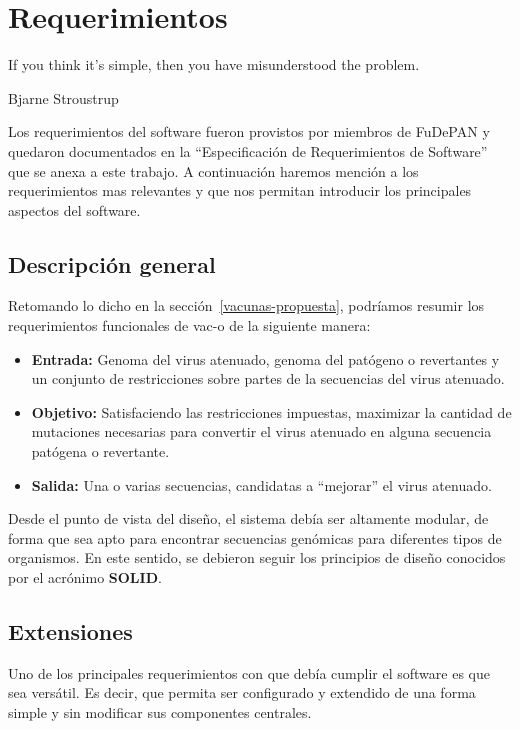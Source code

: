 \chapter{Requerimientos}
\epigraph{If you think it's simple, then you have misunderstood the problem.}%
{Bjarne Stroustrup}

Los requerimientos del software fueron provistos por miembros de \ac{FuDePAN} y
quedaron documentados en la ``Especificaci\'on de Requerimientos de Software''
que se anexa a este trabajo. A continuaci\'on haremos menci\'on a los
requerimientos mas relevantes y que nos permitan introducir los principales
aspectos del software.

\section{Descripci\'on general}

Retomando lo dicho en la secci\'on~\ref{vacunas-propuesta}, podr\'iamos
resumir los requerimientos funcionales de \ac{vac-o} de la siguiente manera:

\begin{itemize}
 \item \textbf{Entrada:} Genoma del virus atenuado, genoma del pat\'ogeno o
revertantes y un conjunto de restricciones sobre partes de la secuencias del
virus atenuado.
 \item \textbf{Objetivo:} Satisfaciendo las restricciones impuestas, maximizar
la cantidad de mutaciones necesarias para convertir el virus atenuado en alguna
secuencia pat\'ogena o revertante.
 \item \textbf{Salida:} Una o varias secuencias, candidatas a ``mejorar'' el
virus atenuado.
\end{itemize}

Desde el punto de vista del dise\~no, el sistema deb\'ia ser altamente modular,
de forma que sea apto para encontrar secuencias gen\'omicas para diferentes
tipos de organismos. En este sentido, se debieron seguir los principios de
dise\~no conocidos por el acr\'onimo \textbf{SOLID}\cite{Martin00}.

\section{Extensiones}

Uno de los principales requerimientos con que deb\'ia cumplir el software es
que sea vers\'atil. Es decir, que permita ser configurado y extendido de una
forma simple y sin modificar sus componentes centrales.

